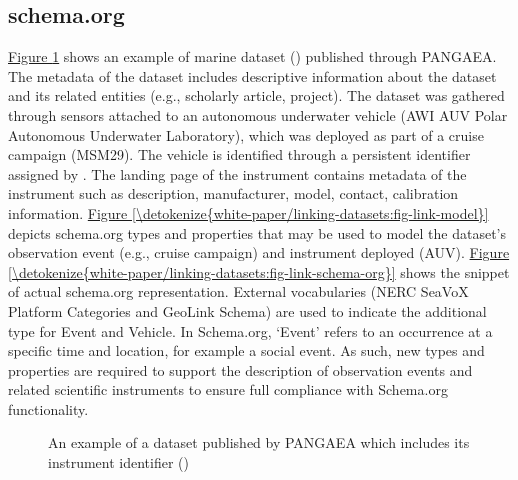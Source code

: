\documentclass[a4paper,10pt,english]{sphinxmanual}
\begin{document}
\subsection{schema.org}
\label{\detokenize{white-paper/linking-datasets:schema-org}}
\hyperref[\detokenize{white-paper/linking-datasets:fig-link-pangea}]{Figure \ref{\detokenize{white-paper/linking-datasets:fig-link-pangea}}} shows an example of marine dataset
() published through PANGAEA. The
metadata of the dataset includes descriptive information about the
dataset and its related entities (e.g., scholarly article, project). The
dataset was gathered through sensors attached to an autonomous
underwater vehicle (AWI AUV Polar Autonomous Underwater Laboratory),
which was deployed as part of a cruise campaign (MSM29). The vehicle is
identified through a persistent identifier assigned by
. The landing page of the instrument contains
metadata of the instrument such as description, manufacturer, model,
contact, calibration information. \hyperref[\detokenize{white-paper/linking-datasets:fig-link-model}]{Figure \ref{\detokenize{white-paper/linking-datasets:fig-link-model}}} depicts
schema.org types and properties that may be used to model the
dataset’s observation event (e.g., cruise campaign) and instrument
deployed (AUV). \hyperref[\detokenize{white-paper/linking-datasets:fig-link-schema-org}]{Figure \ref{\detokenize{white-paper/linking-datasets:fig-link-schema-org}}} shows the snippet of
actual schema.org representation. External vocabularies (NERC SeaVoX
Platform Categories and GeoLink Schema) are used to indicate the
additional type for Event and Vehicle. In Schema.org, ‘Event’ refers
to an occurrence at a specific time and location, for example a social
event. As such, new types and properties are required to support the
description of observation events and related scientific instruments
to ensure full compliance with Schema.org functionality.

\begin{figure}[htbp]
\centering
\capstart

\noindent{}
\caption{An example of a dataset published by PANGAEA which includes its
instrument identifier
()}\label{\detokenize{white-paper/linking-datasets:id6}}\label{\detokenize{white-paper/linking-datasets:fig-link-pangea}}\end{figure}
\end{document}
